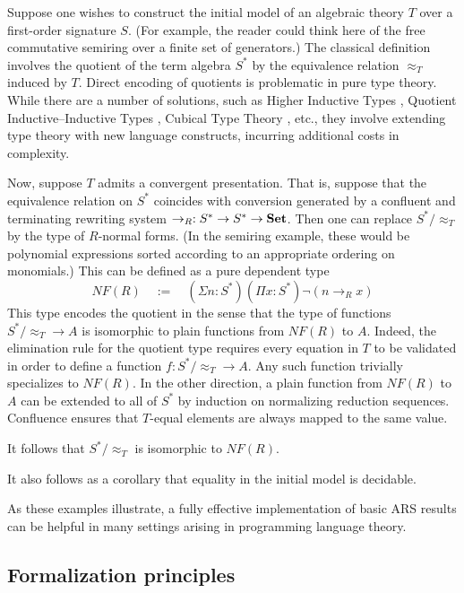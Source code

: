 \begin{example}
Suppose one wishes to construct the initial model of an algebraic theory $T$
over a first-order signature $S$.
(For example, the reader could think here of the free commutative semiring over a finite set of generators.)
The classical definition involves the quotient of the term algebra $S^*$ by
the equivalence relation $\approx_T$ induced by $T$.
Direct encoding of quotients is problematic in pure type theory.
While there are a number of solutions, such as Higher Inductive Types \cite{HoTT},
Quotient Inductive--Inductive Types \cite{QIIT}, Cubical Type Theory \cite{CTT}, etc.,
they involve extending type theory with new language constructs,
incurring additional costs in complexity.

Now, suppose $T$ admits a convergent presentation.
That is, suppose that the equivalence relation on $S^*$ coincides
with conversion generated by a confluent and terminating rewriting system
$\to_R : S^* \to S^* \to \mathbf{Set}$.
Then one can replace $S^*/{\approx_T}$ by the type of $R$-normal forms.
(In the semiring example, these would be polynomial expressions sorted according to
an appropriate ordering on monomials.)
This can be defined as a pure dependent type
\[ NF(R) \quad := \quad (\Sigma n : S^*) (\Pi x : S^*) \lnot (n \to_R x) \]
This type encodes the quotient in the sense that the type of functions $S^*/{\approx_T} \to A$ is isomorphic to plain functions from $NF(R)$ to $A$.
Indeed, the elimination rule for the quotient type requires every equation in $T$
to be validated in order to define a function $f : S^*/{\approx_T} \to A$.
Any such function trivially specializes to $NF(R)$.  In the other direction,
a plain function from $NF(R)$ to $A$
can be extended to all of $S^*$ by induction on normalizing reduction sequences.
Confluence ensures that $T$-equal elements are always mapped to the same value.

It follows that $S^*/{\approx_T}$ is isomorphic to $NF(R)$.

It also follows as a corollary that equality in the initial model is decidable.
\end{example}

As these examples illustrate, a fully effective implementation of basic ARS results
can be helpful in many settings arising in programming language theory.

\subsection{Formalization principles}

